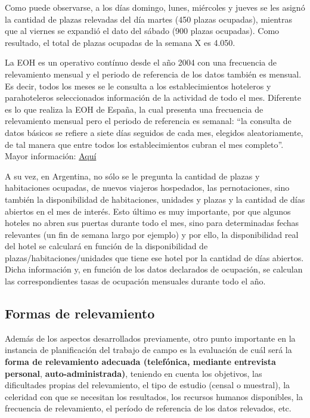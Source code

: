 \documentclass[
]{book}
\begin{document}
Como puede observarse, a los días domingo, lunes, miércoles y jueves se les asignó la cantidad de plazas relevadas del día martes (450 plazas ocupadas), mientras que al viernes se expandió el dato del sábado (900 plazas ocupadas). Como resultado, el total de plazas ocupadas de la semana X es 4.050.

La EOH es un operativo contínuo desde el año 2004 con una frecuencia de relevamiento mensual y el periodo de referencia de los datos también es mensual. Es decir, todos los meses se le consulta a los establecimientos hoteleros y parahoteleros seleccionados información de la actividad de todo el mes. Diferente es lo que realiza la EOH de España, la cual presenta una frecuencia de relevamiento mensual pero el periodo de referencia es semanal: ``la consulta de datos básicos se refiere a siete días seguidos de cada mes, elegidos aleatoriamente, de tal manera que entre todos los establecimientos cubran el mes completo''. Mayor información: \href{https://www.ine.es/daco/daco42/ocuphotel/notaeoh.htm}{Aquí}

A su vez, en Argentina, no sólo se le pregunta la cantidad de plazas y habitaciones ocupadas, de nuevos viajeros hospedados, las pernotaciones, sino también la disponibilidad de habitaciones, unidades y plazas y la cantidad de días abiertos en el mes de interés. Esto último es muy importante, por que algunos hoteles no abren sus puertas durante todo el mes, sino para determinadas fechas relevantes (un fin de semana largo por ejemplo) y por ello, la disponibilidad real del hotel se calculará en función de la disponibilidad de plazas/habitaciones/unidades que tiene ese hotel por la cantidad de días abiertos. Dicha información y, en función de los datos declarados de ocupación, se calculan las correspondientes tasas de ocupación mensuales durante todo el año.

\hypertarget{formas-de-relevamiento}{%
\subsection{Formas de relevamiento}\label{formas-de-relevamiento}}

Además de los aspectos desarrollados previamente, otro punto importante en la instancia de planificación del trabajo de campo es la evaluación de cuál será la \textbf{forma de relevamiento adecuada (telefónica, mediante entrevista personal}, \textbf{auto-administrada)}, teniendo en cuenta los objetivos, las dificultades propias del relevamiento, el tipo de estudio (censal o muestral), la celeridad con que se necesitan los resultados, los recursos humanos disponibles, la frecuencia de relevamiento, el período de referencia de los datos relevados, etc.
\end{document}
